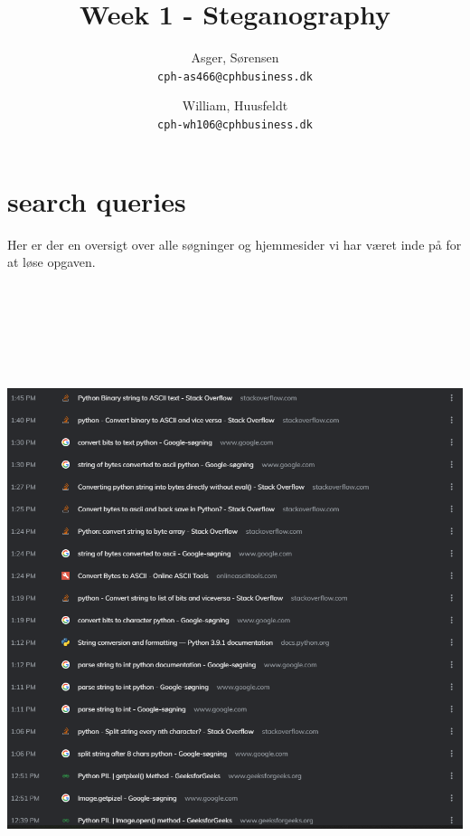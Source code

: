 \documentclass{report}
\title{Week 1 - Steganography}
\author{
    Asger, Sørensen\\
    \texttt{cph-as466@cphbusiness.dk}\\
    \and
    William, Huusfeldt\\
    \texttt{cph-wh106@cphbusiness.dk}\\
   }
\date{}
\begin{document}
\maketitle

\section*{search queries}
Her er der en oversigt over alle søgninger og hjemmesider vi har været inde på for at løse opgaven. 

\includegraphics[height=19cm, width=15cm]{Screenshot 2021-02-10 144213.png}
\end{document}

